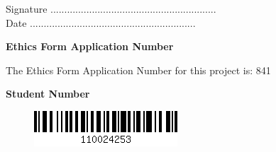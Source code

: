 \vspace{2em}
Signature ............................................................  \\

\vspace{1em}
Date ............................................................ \\

\vspace{1em}
\begin{center}
    {\LARGE\bf Ethics Form Application Number}
\end{center}

The Ethics Form Application Number for this project is: 841

\vspace{1em}
\begin{center}
    {\LARGE\bf Student Number}
\end{center}

\begin{figure}[ht!]
\centering
\includegraphics[scale=1]{images/clg11-barcode.png}
\end{figure}


